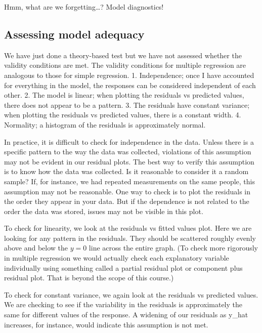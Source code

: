 \documentclass[]{book}
\begin{document}
Hmm, what are we forgetting\ldots{}? Model diagnostics!

\hypertarget{assessing-model-adequacy}{%
\subsection{Assessing model adequacy}\label{assessing-model-adequacy}}

We have just done a theory-based test but we have not assessed whether the validity conditions are met. The validity conditions for multiple regression are analogous to those for simple regression.
1. Independence; once I have accounted for everything in the model, the responses can be considered independent of each other.
2. The model is linear; when plotting the residuals vs predicted values, there does not appear to be a pattern.
3. The residuals have constant variance; when plotting the residuals vs predicted values, there is a constant width.
4. Normality; a histogram of the residuals is approximately normal.

In practice, it is difficult to check for independence in the data. Unless there is a specific pattern to the way the data was collected, violations of this assumption may not be evident in our residual plots. The best way to verify this assumption is to know how the data was collected. Is it reasonable to consider it a random sample? If, for instance, we had repeated measurements on the same people, this assumption may not be reasonable. One way to check is to plot the residuals in the order they appear in your data. But if the dependence is not related to the order the data was stored, issues may not be visible in this plot.

To check for linearity, we look at the residuals vs fitted values plot. Here we are looking for any pattern in the residuals. They should be scattered roughly evenly above and below the \(y=0\) line across the entire graph. (To check more rigorously in multiple regression we would actually check each explanatory variable individually using something called a partial residual plot or component plus residual plot. That is beyond the scope of this course.)

To check for constant variance, we again look at the residuals vs predicted values. We are checking to see if the variability in the residuals is approximately the same for different values of the response. A widening of our residuals as y\_hat increases, for instance, would indicate this assumption is not met.
\end{document}
